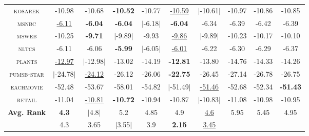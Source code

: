 \begin{sidewaystable}
{\begin{tabular}{c|ccccc|cccc}
    \textsc{kosarek   } & -10.98  & -10.68  & \textbf{-10.52}  & -10.77  & \underline{-10.59}  & $|$-10.61$|$  & -10.97  & -10.86  & -10.85    \\
    \textsc{msnbc     } & \underline{-6.11}   & \textbf{-6.04}   & \textbf{-6.04}   & $|$-6.18$|$   & \textbf{-6.04}   & -6.34  & -6.39   & -6.42   & -6.39      \\
    \textsc{msweb     } & -10.25  & \textbf{-9.71}   & $|$-9.89$|$   & -9.93   & \underline{-9.86}   & $|$-9.89$|$  & -10.23  & -10.17  & -10.10     \\
    \textsc{nltcs     } & -6.11   & -6.06   & \textbf{-5.99}   & $|$-6.05$|$   & \underline{-6.01}   & -6.22  & -6.30   & -6.29   & -6.37      \\
    \textsc{plants    } & \underline{-12.97}  & $|$-12.98$|$  & -13.02  & -14.19  & \textbf{-12.81}  & -13.80  & -14.76  & -14.33  & -14.26    \\
    \textsc{pumsb-star} & $|$-24.78$|$  & \underline{-24.12}  & -26.12  & -26.06  & \textbf{-22.75}  & -26.45  & -27.14  & -26.78  & -26.75    \\
    \textsc{eachmovie } & -52.48  & -53.67  & -58.01  & -54.82  & $|$-51.49$|$  & \underline{-51.46}  & -52.68  & -52.34  & \textbf{-51.43}    \\
    \textsc{retail    } & -11.04  & \underline{-10.81}  & \textbf{-10.72}  & -10.94  & -10.87  & $|$-10.83$|$  & -11.08  & -10.98  & -10.95    \\
    \hline
    \multirow{2}{*}[-0.15em]{\textbf{Avg. Rank}}  & \textbf{4.3}     & $|$4.8$|$     & 5.2     & 4.85    & 4.9     & \underline{4.6}  & 5.95    & 5.45    & 4.95         \\
                                            & 4.3              & 3.65          & $|$3.55$|$ & 3.9  & \textbf{2.15} & \underline{3.45} &   &         &              \\
    \hline
  \end{tabular}
  }

\end{sidewaystable}
